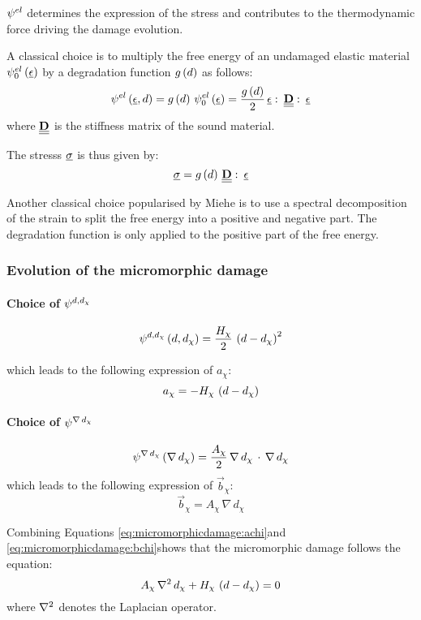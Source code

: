 ${\psi}^{el}$ determines the expression of the stress and contributes
to the thermodynamic force driving the damage evolution.

A classical choice is to multiply the free energy of an undamaged
elastic material \({\psi}^{el}_{0}\left(\underline{\epsilon}\right)\) by a degradation
function \(g\left(d\right)\) as follows:
\[
{\psi}^{el}\left(\underline{\epsilon}, d\right) = 
g\left(d\right)\,{\psi}^{el}_{0}\left(\underline{\epsilon}\right) = \displaystyle \frac{\displaystyle g\left(d\right)}{\displaystyle 2}\,\underline{\epsilon}\,\colon\,\underline{\underline{\mathbf{D}}}\,\colon\,\underline{\epsilon}
\]\label{eq:micromorphicdamage:freeenergygel}
where \(\underline{\underline{\mathbf{D}}}\) is the stiffness matrix of the sound material.

The stresss \(\underline{\sigma}\) is thus given by:
\[
\underline{\sigma} = g\left(d\right)\,\underline{\underline{\mathbf{D}}}\,\colon\,\underline{\epsilon}
\]

Another classical choice popularised by Miehe \cite{miehe_phase_2010} is to
use a spectral decomposition of the strain to split the free energy into
a positive and negative part. The degradation function is only applied
to the positive part of the free energy.

\subsubsection{Evolution of the micromorphic damage}

\paragraph{Choice of \({\psi}^{d, d_{\chi}}\)}

\[
{\psi}^{d, d_{\chi}}\left(d, d_{\chi}\right)=\displaystyle \frac{\displaystyle H_{\chi}}{\displaystyle 2}\,\left(d-d_{\chi}\right)^{2}
\]

which leads to the following expression of \(a_{\chi}\):
\[
a_{\chi} = - H_{\chi}\,\left(d-d_{\chi}\right)
\]\label{eq:micromorphicdamage:achi}

\paragraph{Choice of \({\psi}^{\nabla\,d_{\chi}}\)}

\[
{\psi}^{\nabla\,d_{\chi}}\left(\nabla\, d_{\chi}\right) = \displaystyle \frac{\displaystyle A_{\chi}}{\displaystyle 2}\,\nabla\, d_{\chi}\,\cdot\,\nabla\, d_{\chi}
\]\label{eq:micromorphicdamage:freeenergygdchi}
which leads to the following expression of \(\vec{b}_{\chi}\):
\[
\vec{b}_{\chi} = A_{\chi}\,\nabla\, d_{\chi}
\]\label{eq:micromorphicdamage:bchi}

Combining Equations \eqref{eq:micromorphicdamage:achi}and
\eqref{eq:micromorphicdamage:bchi}shows that the micromorphic damage follows
the equation:
\[
A_{\chi}\,\nabla{}^2\,d_{\chi}+ H_{\chi}\,\left(d-d_{\chi}\right)= 0
\]\label{eq:micromorphicdamage:d_chi2}
where \(\nabla{}^2\) denotes the Laplacian operator.

